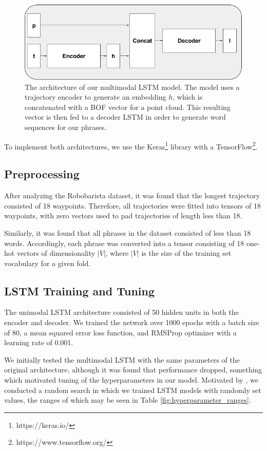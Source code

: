 \documentclass[letterpaper, 12 pt, conference]{ieeeconf}
\begin{document}
\begin{figure}[h]
\centering
\includegraphics[scale=0.33]{Tuple_LSTM}
\caption{The architecture of our multimodal LSTM model. The model uses a trajectory encoder to generate an embedding $h$, which is concatenated with a BOF vector for a point cloud. This resulting vector is then fed to a decoder LSTM in order to generate word sequences for our phrases.}
\label{fig:multimodal_LSTM}
\end{figure}

To implement both architectures, we use the Keras\footnote{https://keras.io/} library with a TensorFlow\footnote{https://www.tensorflow.org/}. 

\subsection{Preprocessing}
After analyzing the Robobarista dataset, it was found  that the longest trajectory consisted of 18 waypoints. Therefore, all trajectories were fitted into tensors of 18 waypoints, with zero vectors used to pad trajectories of length less than 18. 
\par
Similarly, it was found that all phrases in the dataset consisted of less than 18 words. Accordingly, each phrase was converted into a tensor consisting of 18 one-hot vectors of dimensionality $|V|$, where $|V|$ is the size of the training set vocabulary for a given fold.

\subsection{LSTM Training and Tuning}

The unimodal LSTM architecture consisted of 50 hidden units in both the encoder and decoder. We trained the network over 1000 epochs with a batch size of 80, a mean squared error loss function, and RMSProp optimizer with a learning rate of 0.001.

We initially tested the multimodal LSTM with the same parameters of the original architecture, although it was found that performance dropped, something which motivated tuning of the hyperparameters in our model. Motivated by \cite{bergstra2012random}, we conducted a random search in which we trained LSTM models with randomly set values, the ranges of which may be seen in Table \ref{fig:hyperparameter_ranges}. 
\end{document}
